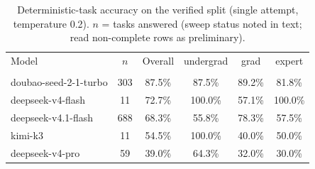 \begin{table}[t]
\centering
\caption{Deterministic-task accuracy on the verified split (single attempt, temperature 0.2). $n$ = tasks answered (sweep status noted in text; read non-complete rows as preliminary).}
\label{tab:baseline}
\small
\begin{tabular}{@{}lccccc@{}}
\toprule
Model & $n$ & Overall & undergrad & grad & expert \\\\
\midrule
doubao-seed-2-1-turbo & 303 & 87.5\% & 87.5\% & 89.2\% & 81.8\% \\
deepseek-v4-flash & 11 & 72.7\% & 100.0\% & 57.1\% & 100.0\% \\
deepseek-v4.1-flash & 688 & 68.3\% & 55.8\% & 78.3\% & 57.5\% \\
kimi-k3 & 11 & 54.5\% & 100.0\% & 40.0\% & 50.0\% \\
deepseek-v4-pro & 59 & 39.0\% & 64.3\% & 32.0\% & 30.0\% \\
\bottomrule
\end{tabular}
\end{table}
